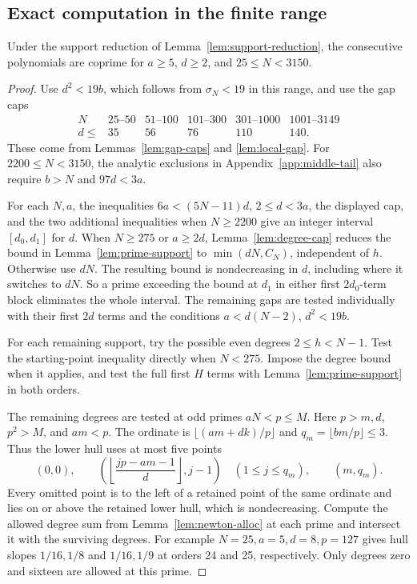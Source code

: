 \subsection{Exact computation in the finite range}

\begin{proposition}
\label{prop:finite}
Under the support reduction of Lemma~\ref{lem:support-reduction},
the consecutive polynomials are coprime for \(a\ge5\), \(d\ge2\),
and \(25\le N<3150\).
\end{proposition}
\begin{proof}
Use \(d^2<19b\), which follows from \(\sigma_N<19\) in this
range, and use the gap caps
\[
\begin{array}{c|ccccc}
N&25\text{--}50&51\text{--}100&101\text{--}300&301\text{--}1000&
1001\text{--}3149\\
d\le&35&56&76&110&140 .
\end{array}
\]
These come from Lemmas~\ref{lem:gap-caps} and \ref{lem:local-gap}.
For \(2200\le N<3150\), the analytic exclusions in
Appendix~\ref{app:middle-tail} also require \(b>N\) and
\(97d<3a\).

For each \(N,a\), the inequalities \(6a<(5N-11)d\), \(2\le d<3a\),
the displayed cap, and the two additional inequalities when
\(N\ge2200\) give an integer interval \([d_0,d_1]\) for \(d\).
When \(N\ge275\) or \(a\ge2d\), Lemma~\ref{lem:degree-cap}
reduces the bound in Lemma~\ref{lem:prime-support} to
\(\min(dN,C_N)\), independent of \(h\). Otherwise use \(dN\).
The resulting bound is nondecreasing in \(d\), including where
it switches to \(dN\). So a prime exceeding the bound at \(d_1\)
in either first \(2d_0\)-term block eliminates the whole interval.
The remaining gaps are tested individually with their first
\(2d\) terms and the conditions \(a<d(N-2)\), \(d^2<19b\).

For each remaining support, try the possible even degrees
\(2\le h<N-1\). Test the starting-point inequality directly
when \(N<275\). Impose the degree bound when it applies, and
test the full first \(H\) terms with
Lemma~\ref{lem:prime-support} in both orders.

The remaining degrees are tested at odd primes \(aN<p\le M\).
Here \(p>m,d\), \(p^2>M\), and \(am<p\). The ordinate is
\(\lfloor(am+dk)/p\rfloor\) and \(q_m=\lfloor bm/p\rfloor\le3\).
Thus the lower hull uses at most five points
\[
 (0,0),\qquad
 \left(\left\lfloor\frac{jp-am-1}{d}\right\rfloor,j-1\right)
 \quad(1\le j\le q_m),\qquad (m,q_m).
\]
Every omitted point is to the left of a retained point of the
same ordinate and lies on or above the retained lower hull,
which is nondecreasing. Compute the allowed degree sum from
Lemma~\ref{lem:newton-alloc} at each prime and intersect it with
the surviving degrees. For example \(N=25,a=5,d=8,p=127\)
gives hull slopes \(1/16,1/8\) and \(1/16,1/9\) at orders
24 and 25, respectively. Only degrees zero and sixteen are
allowed at this prime.


\end{proof}

